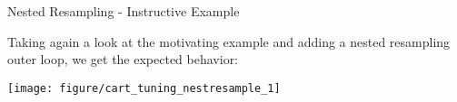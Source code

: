 \documentclass[11pt,compress,t,notes=noshow, xcolor=table]{beamer}
\begin{document}
\begin{vbframe}{Nested Resampling - Instructive Example}

Taking again a look at the motivating example and adding a nested resampling outer loop, we get the expected behavior:

\begin{knitrout}\scriptsize
{}\color{fgcolor}

{\centering \texttt{[image: figure/cart\_tuning\_nestresample\_1]} 
}


\end{knitrout}


\end{vbframe}
\endlecture
\end{document}
